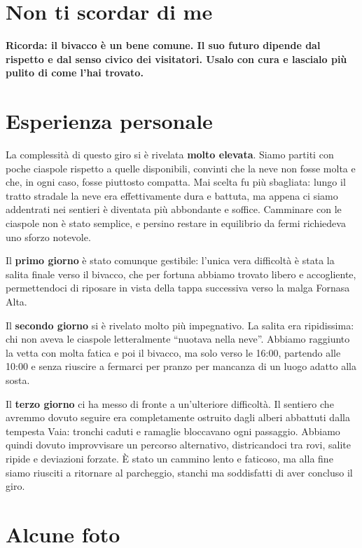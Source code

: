\documentclass{article}
\begin{document}
\section{Non ti scordar di me}
\textbf{\textcolor{BurntOrange}{Ricorda: il bivacco è un bene comune. Il suo futuro dipende dal rispetto e dal senso civico dei visitatori. Usalo con cura e lascialo più pulito di come l'hai trovato.}}


\section{Esperienza personale}
La complessità di questo giro si è rivelata \textbf{molto elevata}.
Siamo partiti con poche ciaspole rispetto a quelle disponibili, convinti che la neve non fosse molta e che, in ogni caso, fosse piuttosto compatta. Mai scelta fu più sbagliata: lungo il tratto stradale la neve era effettivamente dura e battuta, ma appena ci siamo addentrati nei sentieri è diventata più abbondante e soffice.
Camminare con le ciaspole non è stato semplice, e persino restare in equilibrio da fermi richiedeva uno sforzo notevole. 

Il \textbf{primo giorno} è stato comunque gestibile: l’unica vera difficoltà è stata la salita finale verso il bivacco, che per fortuna abbiamo trovato libero e accogliente, permettendoci di riposare in vista della tappa successiva verso la malga Fornasa Alta.

Il \textbf{secondo giorno} si è rivelato molto più impegnativo. La salita era ripidissima: chi non aveva le ciaspole letteralmente “nuotava nella neve”. Abbiamo raggiunto la vetta con molta fatica e poi il bivacco, ma solo verso le 16:00, partendo alle 10:00 e senza riuscire a fermarci per pranzo per mancanza di un luogo adatto alla sosta.

Il \textbf{terzo giorno} ci ha messo di fronte a un’ulteriore difficoltà. Il sentiero che avremmo dovuto seguire era completamente ostruito dagli alberi abbattuti dalla tempesta Vaia: tronchi caduti e ramaglie bloccavano ogni passaggio. Abbiamo quindi dovuto improvvisare un percorso alternativo, districandoci tra rovi, salite ripide e deviazioni forzate. È stato un cammino lento e faticoso, ma alla fine siamo riusciti a ritornare al parcheggio, stanchi ma soddisfatti di aver concluso il giro.


\section{Alcune foto}
\end{document}
